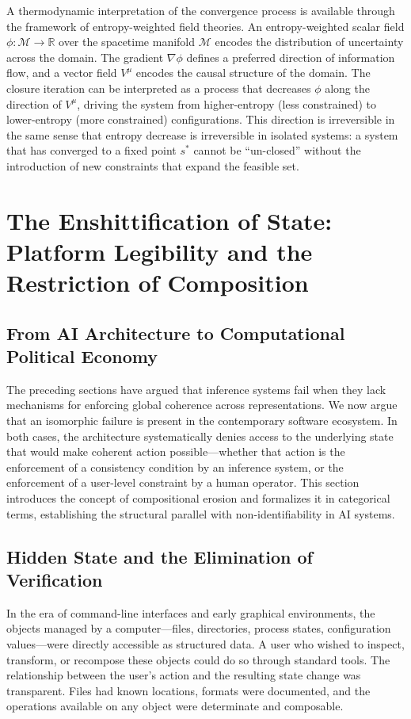 \documentclass[12pt, oneside]{article}
\begin{document}
A thermodynamic interpretation of the convergence process is available through the framework of entropy-weighted field theories. An entropy-weighted scalar field $\phi : \mathcal{M} \to \mathbb{R}$ over the spacetime manifold $\mathcal{M}$ encodes the distribution of uncertainty across the domain. The gradient $\nabla \phi$ defines a preferred direction of information flow, and a vector field $V^\mu$ encodes the causal structure of the domain. The closure iteration can be interpreted as a process that decreases $\phi$ along the direction of $V^\mu$, driving the system from higher-entropy (less constrained) to lower-entropy (more constrained) configurations. This direction is irreversible in the same sense that entropy decrease is irreversible in isolated systems: a system that has converged to a fixed point $s^*$ cannot be ``un-closed'' without the introduction of new constraints that expand the feasible set.

\section{The Enshittification of State: Platform Legibility and the Restriction of Composition}

\subsection{From AI Architecture to Computational Political Economy}

The preceding sections have argued that inference systems fail when they lack mechanisms for enforcing global coherence across representations. We now argue that an isomorphic failure is present in the contemporary software ecosystem. In both cases, the architecture systematically denies access to the underlying state that would make coherent action possible---whether that action is the enforcement of a consistency condition by an inference system, or the enforcement of a user-level constraint by a human operator. This section introduces the concept of compositional erosion and formalizes it in categorical terms, establishing the structural parallel with non-identifiability in AI systems.

\subsection{Hidden State and the Elimination of Verification}

In the era of command-line interfaces and early graphical environments, the objects managed by a computer---files, directories, process states, configuration values---were directly accessible as structured data. A user who wished to inspect, transform, or recompose these objects could do so through standard tools. The relationship between the user's action and the resulting state change was transparent. Files had known locations, formats were documented, and the operations available on any object were determinate and composable.
\end{document}
